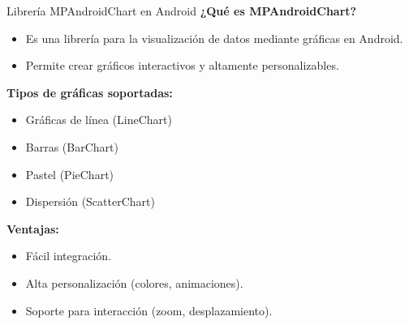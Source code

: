 
\begin{frame}[fragile]{Librería MPAndroidChart en Android}
\textbf{¿Qué es MPAndroidChart?}

\begin{itemize}
    \item Es una librería para la visualización de datos mediante gráficas en Android.
    \item Permite crear gráficos interactivos y altamente personalizables.
\end{itemize}

\vspace{0.3cm}

\textbf{Tipos de gráficas soportadas:}
\begin{itemize}
    \item Gráficas de línea (LineChart)
    \item Barras (BarChart)
    \item Pastel (PieChart)
    \item Dispersión (ScatterChart)
\end{itemize}

\textbf{Ventajas:}
\begin{itemize}
    \item Fácil integración.
    \item Alta personalización (colores, animaciones).
    \item Soporte para interacción (zoom, desplazamiento).
\end{itemize}

\end{frame}




